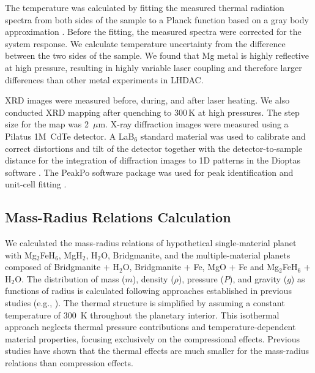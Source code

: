 \documentclass[draft,jgrga,12pt]{agujournal2019}
\begin{document}
The temperature was calculated by fitting the measured thermal radiation spectra from both sides of the sample to a Planck function based on a gray body approximation \cite{prakapenka_advanced_2008}. 
Before the fitting, the measured spectra were corrected for the system response.
We calculate temperature uncertainty from the difference between the two sides of the sample. 
We found that Mg metal is highly reflective at high pressure, resulting in highly variable laser coupling and therefore larger differences than other metal experiments in LHDAC\@.

 XRD images were measured before, during, and after laser heating. 
We also conducted XRD mapping after quenching to 300\,K at high pressures. %
The step size for the map was 2~$\mu\mathrm{m}$.
X-ray diffraction images were measured using a Pilatus 1M~CdTe detector. 
A LaB$_6$ standard material was used to calibrate and correct distortions and tilt of the detector together with the detector-to-sample distance for the integration of diffraction images to 1D patterns in the Dioptas software \cite{prescher_dioptas_2015}. 
The PeakPo software package was used for peak identification and unit-cell fitting \cite{shim_shdshim_2018}.

\subsection{Mass-Radius Relations Calculation}

We calculated the mass-radius relations of hypothetical single-material planet with Mg$_2$FeH$_6$, MgH$_2$, H$_2$O, Bridgmanite, and the multiple-material planets composed of Bridgmanite + H$_2$O, Bridgmanite + Fe, MgO + Fe and Mg$_2$FeH$_6$ + H$_2$O. 
The distribution of mass ($m$), density ($\rho$), pressure ($P$), and gravity ($g$) as functions of radius is calculated following approaches established in previous studies (e.g., ).
The thermal structure is simplified by assuming a constant temperature of 300~K throughout the planetary interior. 
This isothermal approach neglects thermal pressure contributions and temperature-dependent material properties, focusing exclusively on the compressional effects.
Previous studies \cite{zeng_new_2021, zeng_detailed_2013} have shown that the thermal effects are much smaller for the mass-radius relations than compression effects.
\end{document}
